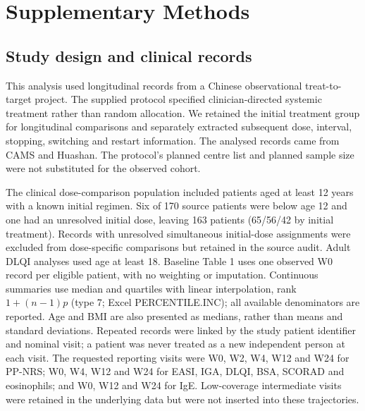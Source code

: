 \section{Supplementary Methods}
\subsection{Study design and clinical records}
This analysis used longitudinal records from a Chinese observational treat-to-target project. The supplied protocol specified clinician-directed systemic treatment rather than random allocation. We retained the initial treatment group for longitudinal comparisons and separately extracted subsequent dose, interval, stopping, switching and restart information. The analysed records came from CAMS and Huashan. The protocol's planned centre list and planned sample size were not substituted for the observed cohort.

The clinical dose-comparison population included patients aged at least 12 years with a known initial regimen. Six of 170 source patients were below age 12 and one had an unresolved initial dose, leaving 163 patients (65/56/42 by initial treatment). Records with unresolved simultaneous initial-dose assignments were excluded from dose-specific comparisons but retained in the source audit. Adult DLQI analyses used age at least 18. Baseline Table 1 uses one observed W0 record per eligible patient, with no weighting or imputation. Continuous summaries use median and quartiles with linear interpolation, rank $1+(n-1)p$ (type 7; Excel PERCENTILE.INC); all available denominators are reported. Age and BMI are also presented as medians, rather than means and standard deviations. Repeated records were linked by the study patient identifier and nominal visit; a patient was never treated as a new independent person at each visit. The requested reporting visits were W0, W2, W4, W12 and W24 for PP-NRS; W0, W4, W12 and W24 for EASI, IGA, DLQI, BSA, SCORAD and eosinophils; and W0, W12 and W24 for IgE. Low-coverage intermediate visits were retained in the underlying data but were not inserted into these trajectories.

